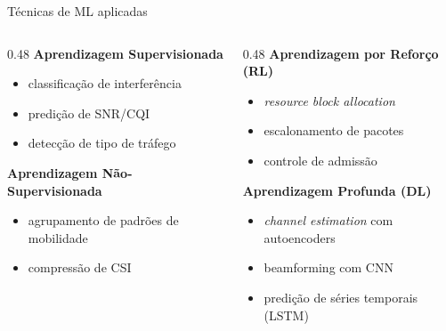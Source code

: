 \documentclass[aspectratio=169,11pt]{beamer}
\begin{document}
\begin{frame}{Técnicas de ML aplicadas}
  \begin{columns}
    \begin{column}{0.48\textwidth}
      \textbf{Aprendizagem Supervisionada}
      \begin{itemize}
        \item classificação de interferência
        \item predição de SNR/CQI
        \item detecção de tipo de tráfego
      \end{itemize}
      \textbf{Aprendizagem Não-Supervisionada}
      \begin{itemize}
        \item agrupamento de padrões de mobilidade
        \item compressão de CSI
      \end{itemize}
    \end{column}
    \begin{column}{0.48\textwidth}
      \textbf{Aprendizagem por Reforço (RL)}
      \begin{itemize}
        \item \emph{resource block allocation}
        \item escalonamento de pacotes
        \item controle de admissão
      \end{itemize}
      \textbf{Aprendizagem Profunda (DL)}
      \begin{itemize}
        \item \emph{channel estimation} com autoencoders
        \item beamforming com CNN
        \item predição de séries temporais (LSTM)
      \end{itemize}
    \end{column}
  \end{columns}
\end{frame}
\end{document}
